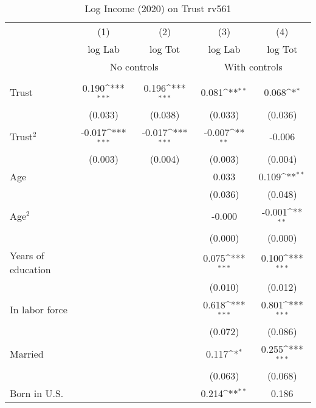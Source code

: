 \begin{table}[htbp]\centering
\def\sym#1{\ifmmode^{#1}\else\(^{#1}\)\fi}
\caption{Log Income (2020) on Trust rv561}
\begin{tabular}{l*{4}{c}}
\toprule
          &\multicolumn{1}{c}{(1)}&\multicolumn{1}{c}{(2)}&\multicolumn{1}{c}{(3)}&\multicolumn{1}{c}{(4)}\\
          &\multicolumn{1}{c}{log Lab}&\multicolumn{1}{c}{log Tot}&\multicolumn{1}{c}{log Lab}&\multicolumn{1}{c}{log Tot}\\
& \multicolumn{2}{c}{No controls} & \multicolumn{2}{c}{With controls} \\\\ \cmidrule(lr){2-3}\cmidrule(lr){4-5}
Trust     &    0.190\sym{***}&    0.196\sym{***}&    0.081\sym{**} &    0.068\sym{*}  \\
          &  (0.033)         &  (0.038)         &  (0.033)         &  (0.036)         \\
Trust$^{2}$&   -0.017\sym{***}&   -0.017\sym{***}&   -0.007\sym{**} &   -0.006         \\
          &  (0.003)         &  (0.004)         &  (0.003)         &  (0.004)         \\
Age       &                  &                  &    0.033         &    0.109\sym{**} \\
          &                  &                  &  (0.036)         &  (0.048)         \\
Age$^{2}$ &                  &                  &   -0.000         &   -0.001\sym{**} \\
          &                  &                  &  (0.000)         &  (0.000)         \\
Years of education&                  &                  &    0.075\sym{***}&    0.100\sym{***}\\
          &                  &                  &  (0.010)         &  (0.012)         \\
In labor force&                  &                  &    0.618\sym{***}&    0.801\sym{***}\\
          &                  &                  &  (0.072)         &  (0.086)         \\
Married   &                  &                  &    0.117\sym{*}  &    0.255\sym{***}\\
          &                  &                  &  (0.063)         &  (0.068)         \\
Born in U.S.&                  &                  &    0.214\sym{**} &    0.186         \\

\end{tabular}
\end{table}
